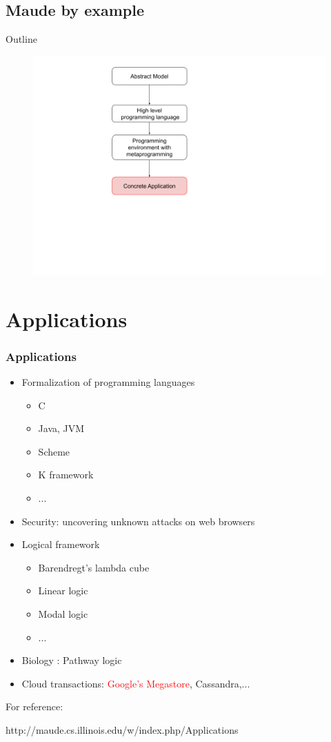 \documentclass{beamer}
\begin{document}
\subsection{Maude by example}
\begin{frame}{Outline}
    \begin{figure}
        \includegraphics[height=\textheight]{img/sec4.png}
    \end{figure}
\end{frame}
\section{Applications}
\begin{frame}
    \frametitle{Applications}
    \begin{itemize}
        \item Formalization of programming languages 
        \begin{itemize}
            \item C
            \item Java, JVM
            \item Scheme
            \item K framework
            \item ...
        \end{itemize}
        \item Security: uncovering unknown attacks on web browsers 
        \item Logical framework 
        \begin{itemize}
            \item Barendregt's lambda cube 
            \item Linear logic 
            \item Modal logic
            \item ...
        \end{itemize}
        \item Biology : Pathway logic 
        \item Cloud transactions: \textcolor{red}{Google's Megastore}, Cassandra,...
    \end{itemize}

    For reference:

    http://maude.cs.illinois.edu/w/index.php/Applications
\end{frame}
\end{document}
